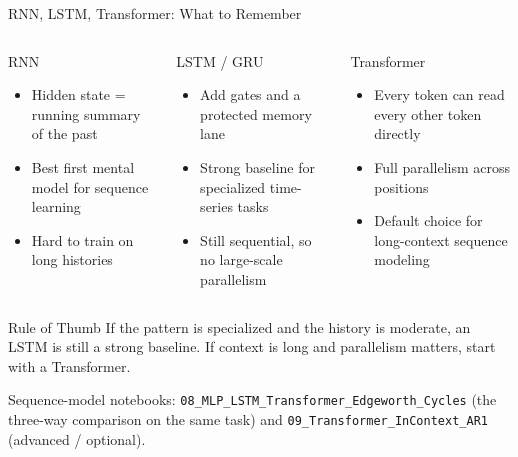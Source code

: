 \documentclass[aspectratio=169,11pt]{beamer}
\begin{document}
\begin{frame}{RNN, LSTM, Transformer: What to Remember}
\footnotesize
\begin{columns}[T]
\begin{block}{RNN}
\begin{itemize}\itemsep1pt
    \item Hidden state = running summary of the past
    \item Best first mental model for sequence learning
    \item Hard to train on long histories
\end{itemize}
\end{block}

\begin{block}{LSTM / GRU}
\begin{itemize}\itemsep1pt
    \item Add gates and a protected memory lane
    \item Strong baseline for specialized time-series tasks
    \item Still sequential, so no large-scale parallelism
\end{itemize}
\end{block}

\begin{block}{Transformer}
\begin{itemize}\itemsep1pt
    \item Every token can read every other token directly
    \item Full parallelism across positions
    \item Default choice for long-context sequence modeling
\end{itemize}
\end{block}
\end{columns}

\vspace{3pt}
\begin{exampleblock}{Rule of Thumb}
If the pattern is specialized and the history is moderate, an LSTM is still a strong baseline.  If context is long and parallelism matters, start with a Transformer.
\end{exampleblock}

\vspace{1pt}
{\scriptsize Sequence-model notebooks: \texttt{08\_MLP\_LSTM\_Transformer\_Edgeworth\_Cycles} (the three-way comparison on the same task) and \texttt{09\_Transformer\_InContext\_AR1} (advanced / optional).}
\end{frame}
\end{document}
